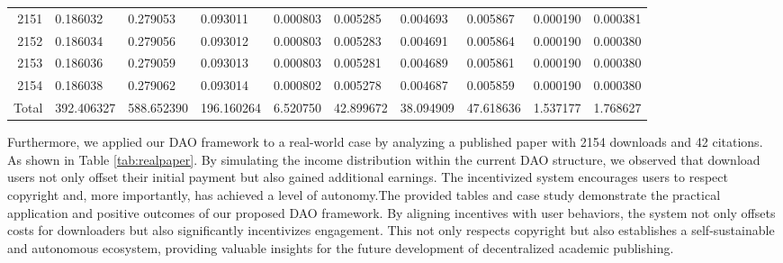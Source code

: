 \documentclass[lettersize,journal]{IEEEtran}
\begin{document}
\begin{table}[t!]
\begin{center}
\begin{tabular}{r|l|l|l|l|l|l|l|l|l}
      2151 & 0.186032 & 0.279053 & 0.093011 & 0.000803 & 0.005285 & 0.004693 & 0.005867 & 0.000190 & 0.000381 \\
      2152 & 0.186034 & 0.279056 & 0.093012 & 0.000803 & 0.005283 & 0.004691 & 0.005864 & 0.000190 & 0.000380 \\
      2153 & 0.186036 & 0.279059 & 0.093013 & 0.000803 & 0.005281 & 0.004689 & 0.005861 & 0.000190 & 0.000380 \\
      2154 & 0.186038 & 0.279062 & 0.093014 & 0.000802 & 0.005278 & 0.004687 & 0.005859 & 0.000190 & 0.000380 \\
      Total & 392.406327 & 588.652390 & 196.160264 & 6.520750 & 42.899672 & 38.094909 & 47.618636 & 1.537177 & 1.768627 \\
      
    \end{tabular}
  \end{center}
\end{table}

Furthermore, we applied our DAO framework to a real-world case by analyzing a published paper with 2154 downloads and 42 citations. As shown in Table \ref{tab:realpaper}. By simulating the income distribution within the current DAO structure, we observed that download users not only offset their initial payment but also gained additional earnings. The incentivized system encourages users to respect copyright and, more importantly, has achieved a level of autonomy.The provided tables and case study demonstrate the practical application and positive outcomes of our proposed DAO framework. By aligning incentives with user behaviors, the system not only offsets costs for downloaders but also significantly incentivizes engagement. This not only respects copyright but also establishes a self-sustainable and autonomous ecosystem, providing valuable insights for the future development of decentralized academic publishing.

\end{document}
